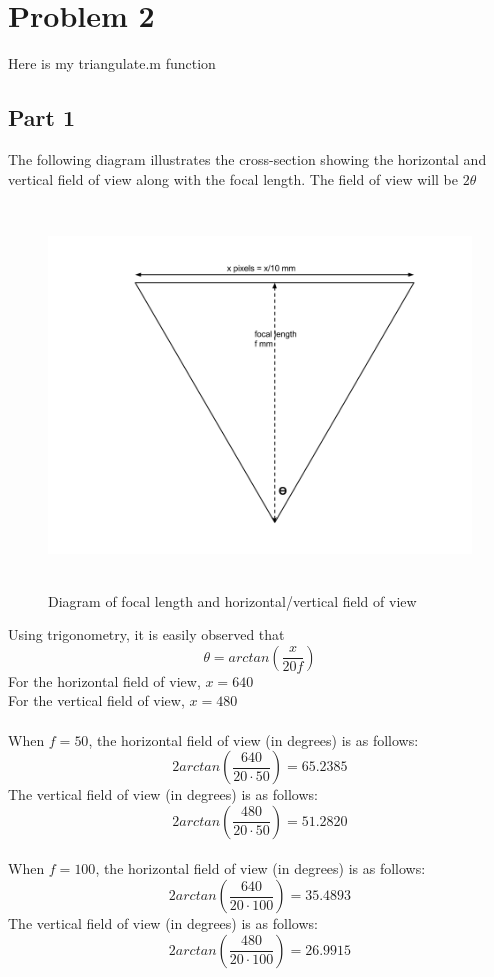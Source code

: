 \documentclass[11pt,psfig]{article}
\begin{document}
\section{Problem 2}

Here is my triangulate.m function


\subsection{Part 1}

The following diagram illustrates the cross-section showing the horizontal and vertical field of view along with the focal length. The field of view will be $2\theta$

\begin{figure}[H]
\centering
\includegraphics[height=4in]{hw1prob2drawing1.png}
\caption{Diagram of focal length and horizontal/vertical field of view}
\end{figure}

Using trigonometry, it is easily observed that
\[
\theta = arctan(\frac{x}{20f})
\]
\newpage
For the horizontal field of view, $x=640$\\
For the vertical field of view, $x=480$ \\
\\
When $f=50$, the horizontal field of view (in degrees) is as follows: 
\[
2arctan(\frac{640}{20 \cdot 50}) = 65.2385
\]
The vertical field of view (in degrees) is as follows:
\[
2arctan(\frac{480}{20 \cdot 50}) = 51.2820
\]
\\
When $f=100$, the horizontal field of view (in degrees) is as follows: 
\[
2arctan(\frac{640}{20 \cdot 100}) = 35.4893
\]
The vertical field of view (in degrees) is as follows:
\[
2arctan(\frac{480}{20 \cdot 100}) = 26.9915
\]
\end{document}
